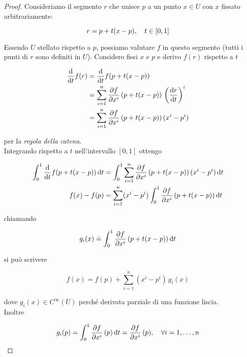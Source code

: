 \begin{proof}
	Consideriamo il segmento $ r $ che  unisce $ p $ a un punto $ x \in U $ con $ x $ fissato  arbitrariamente:
	
	\begin{equation}
		r=p+t(x-p) \qcomma t \in [0,1]
	\end{equation}
	
	Essendo $ U $ stellato rispetto a $ p $, possiamo valutare $ f $ in questo segmento (tutti i punti di $ r $ sono definiti in $ U $). Considero fissi $ x $ e $ p $ e derivo $ f(r) $ rispetto a $ t $
	
	\begin{align}
		\begin{split}
			\dv{t} f(r) &= \dv{t} f(p+t(x-p))\\
			&= \sum_{i=1}^{n} \pdv{f}{x^{i}} \, (p+t(x-p)) \, \left( \dv{r}{t} \right)^{i}\\
			&= \sum_{i=1}^{n} \pdv{f}{x^{i}} \, (p+t(x-p)) \, (x^{i}-p^{i})
		\end{split}
	\end{align}
	
	per la \textit{regola della catena}.\\
	Integrando rispetto a $ t $ nell'intervallo $ [0,1] $ ottengo
	
	\begin{align}
		\begin{split}
			\int_{0}^{1} \dv{t} f(p+t(x-p)) \dd{t} &= \int_{0}^{1} \sum_{i=1}^{n} \pdv{f}{x^{i}} \, (p+t(x-p)) \, (x^{i}-p^{i}) \dd{t}\\
			f(x) - f(p)&= \sum_{i=1}^{n} (x^{i}-p^{i}) \int_{0}^{1} \pdv{f}{x^{i}} \, (p+t(x-p)) \dd{t}
		\end{split}
	\end{align}
	
	chiamando
	
	\begin{equation}
		g_{i}(x) \doteq \int_{0}^{1} \pdv{f}{x^{i}} \, (p+t(x-p)) \dd{t}
	\end{equation}
	
	si può scrivere
	
	\begin{equation}
		f(x)= f(p) + \sum_{i=1}^{n} (x^{i}-p^{i}) \, g_{i}(x)
	\end{equation}
	
	dove $ g_{i}(x) \in C^{\infty}(U) $ perché derivata parziale di una funzione liscia.\\
	Inoltre
	
	\begin{equation}
		g_{i}(p) = \int_{0}^{1} \pdv{f}{x^{i}} \, (p) \dd{t} = \pdv{f}{x^{i}} \, (p) \qcomma \forall i=1,\dots,n
	\end{equation}
\end{proof}

